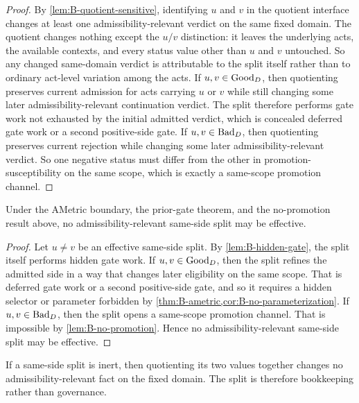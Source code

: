 \begin{proof}
By \cref{lem:B-quotient-sensitive}, identifying $u$ and $v$ in the quotient interface changes at least one admissibility-relevant verdict on the same fixed domain. The quotient changes nothing except the $u/v$ distinction: it leaves the underlying acts, the available contexts, and every status value other than $u$ and $v$ untouched. So any changed same-domain verdict is attributable to the split itself rather than to ordinary act-level variation among the acts. If $u,v\in \mathrm{Good}_D$, then quotienting preserves current admission for acts carrying $u$ or $v$ while still changing some later admissibility-relevant continuation verdict. The split therefore performs gate work not exhausted by the initial admitted verdict, which is concealed deferred gate work or a second positive-side gate. If $u,v\in \mathrm{Bad}_D$, then quotienting preserves current rejection while changing some later admissibility-relevant verdict. So one negative status must differ from the other in promotion-susceptibility on the same scope, which is exactly a same-scope promotion channel.
\end{proof}

\begin{proposition}
\label{prop:B-no-effective-split}
Under the AMetric boundary, the prior-gate theorem, and the no-promotion result above, no admissibility-relevant same-side split may be effective.
\end{proposition}

\begin{proof}
Let $u\neq v$ be an effective same-side split. By \cref{lem:B-hidden-gate}, the split itself performs hidden gate work. If $u,v\in \mathrm{Good}_D$, then the split refines the admitted side in a way that changes later eligibility on the same scope. That is deferred gate work or a second positive-side gate, and so it requires a hidden selector or parameter forbidden by \cref{thm:B-ametric,cor:B-no-parameterization}. If $u,v\in \mathrm{Bad}_D$, then the split opens a same-scope promotion channel. That is impossible by \cref{lem:B-no-promotion}. Hence no admissibility-relevant same-side split may be effective.
\end{proof}

\begin{proposition}
\label{prop:B-inert-collapse}
If a same-side split is inert, then quotienting its two values together changes no admissibility-relevant fact on the fixed domain. The split is therefore bookkeeping rather than governance.
\end{proposition}

